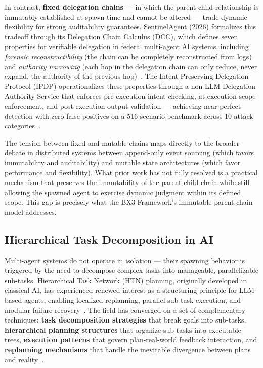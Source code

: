In contrast, \textbf{fixed delegation chains} — in which the parent-child relationship is immutably established at spawn time and cannot be altered — trade dynamic flexibility for strong auditability guarantees. SentinelAgent (2026) formalizes this tradeoff through its Delegation Chain Calculus (DCC), which defines seven properties for verifiable delegation in federal multi-agent AI systems, including \textit{forensic reconstructibility} (the chain can be completely reconstructed from logs) and \textit{authority narrowing} (each hop in the delegation chain can only reduce, never expand, the authority of the previous hop)~\cite{sentinelagent}. The Intent-Preserving Delegation Protocol (IPDP) operationalizes these properties through a non-LLM Delegation Authority Service that enforces pre-execution intent checking, at-execution scope enforcement, and post-execution output validation — achieving near-perfect detection with zero false positives on a 516-scenario benchmark across 10 attack categories~\cite{sentinelagent}.

The tension between fixed and mutable chains maps directly to the broader debate in distributed systems between append-only event sourcing (which favors immutability and auditability) and mutable state architectures (which favor performance and flexibility). What prior work has not fully resolved is a practical mechanism that preserves the immutability of the parent-child chain while still allowing the spawned agent to exercise dynamic judgment within its defined scope. This gap is precisely what the BX3 Framework's immutable parent chain model addresses.

\subsection{Hierarchical Task Decomposition in AI}

Multi-agent systems do not operate in isolation — their spawning behavior is triggered by the need to decompose complex tasks into manageable, parallelizable sub-tasks. Hierarchical Task Network (HTN) planning, originally developed in classical AI, has experienced renewed interest as a structuring principle for LLM-based agents, enabling localized replanning, parallel sub-task execution, and modular failure recovery~\cite{htn-planning}. The field has converged on a set of complementary techniques: \textbf{task decomposition strategies} that break goals into sub-tasks, \textbf{hierarchical planning structures} that organize sub-tasks into executable trees, \textbf{execution patterns} that govern plan-real-world feedback interaction, and \textbf{replanning mechanisms} that handle the inevitable divergence between plans and reality~\cite{goal-decomposition}.

